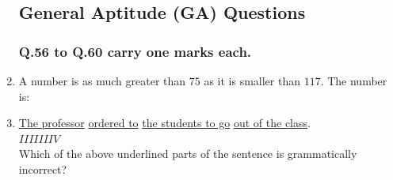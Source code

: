 \documentclass[journal,12pt,onecolumn]{IEEEtran}
\theoremstyle{remark}
\begin{document}
\begin{enumerate}[start = 26 ]
\subsection*{General Aptitude (GA) Questions }    

\subsubsection{Q.56 to Q.60 carry one marks each. }

        \item A number is as much greater than $75$ as it is smaller than $117$. The number is: \hfill{}
            \begin{enumerate}
            \end{enumerate}
            

        \item \underline{The professor} \underline{ordered to} \underline{ the students to go} \underline{out of the class}. \\\hspace{2cm}$I$\hspace{3cm}$II$\hspace{2.5cm}$III$\hspace{2cm}$IV$\\
        Which of the above underlined parts of the sentence is grammatically incorrect?\hfill{}
        
            \begin{enumerate}
                
            \end{enumerate}


\end{enumerate}
\end{document}
